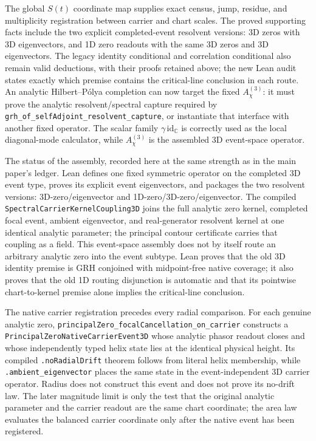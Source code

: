 \documentclass[11pt]{article}
\theoremstyle{definition}
\begin{document}
The global \(S(t)\) coordinate map supplies exact census, jump, residue, and
multiplicity registration between carrier and chart scales.  The proved
supporting facts include the two explicit completed-event resolvent versions:
3D zeros with 3D eigenvectors, and 1D zero readouts with the same 3D zeros and
3D eigenvectors.  The legacy identity
conditional and correlation conditional also remain valid deductions, with
their proofs retained above; the new Lean audit states exactly which premise
contains the critical-line conclusion in each route.  An analytic
Hilbert--P\'olya completion can now target the fixed
\(A^{(3)}_\chi\): it must prove the analytic resolvent/spectral capture
required by \texttt{grh\_of\_selfAdjoint\_resolvent\_capture}, or
instantiate that interface with another fixed operator.  The scalar family
\(\gamma\,\mathrm{id}_{\mathbb C}\) is correctly used as the local
diagonal-mode calculator, while \(A^{(3)}_\chi\) is the assembled 3D
event-space operator.

The status of the assembly, recorded here at the same strength as in the
main paper's ledger.  Lean defines one fixed symmetric operator on the
completed 3D event type, proves its explicit event eigenvectors, and
packages the two resolvent versions: 3D-zero/eigenvector and
1D-zero/3D-zero/eigenvector.  The compiled
\texttt{SpectralCarrierKernelCoupling3D} joins the full analytic zero
kernel, completed focal event, ambient eigenvector, and real-generator
resolvent kernel at one identical analytic parameter; the principal contour
certificate carries that coupling as a field.  This event-space assembly
does not by itself route an arbitrary analytic zero into the event subtype.
Lean proves that the old 3D identity premise is GRH conjoined with
midpoint-free native coverage; it also proves that the old 1D routing
disjunction is automatic and that its pointwise chart-to-kernel premise
alone implies the critical-line conclusion.

The native carrier registration precedes every radial comparison.  For
each genuine analytic zero, \texttt{principalZero\_focalCancellation\_on\_carrier}
constructs a \texttt{PrincipalZeroNativeCarrierEvent3D} whose analytic phasor
readout closes and whose independently typed helix state lies at the identical
physical height.  Its compiled \texttt{.noRadialDrift} theorem follows from
literal helix membership, while \texttt{.ambient\_eigenvector} places the same
state in the event-independent 3D carrier operator.  Radius does not construct
this event and does not prove its no-drift law.  The later magnitude limit is
only the test that the original analytic parameter and the carrier readout are
the same chart coordinate; the area law evaluates the balanced carrier
coordinate only after the native event has been registered.
\end{document}
